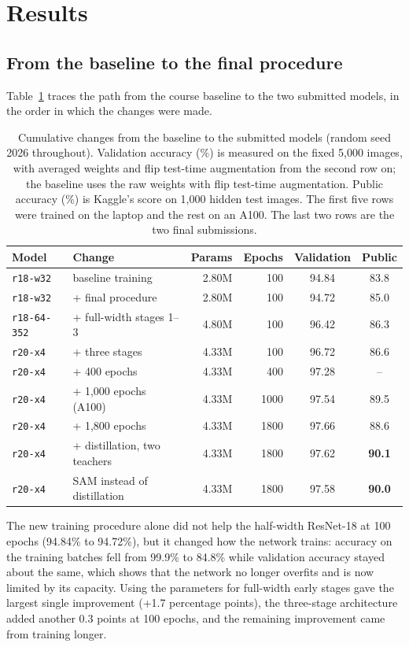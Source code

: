 \documentclass[letterpaper]{article}
\begin{document}
\section{Results}
\subsection{From the baseline to the final procedure}
Table~\ref{tab:progression} traces the path from the course baseline to the two submitted models, in the order in which the
changes were made.

\begin{table}[t]
\centering
\scriptsize
\setlength{\tabcolsep}{2.4pt}
\begin{tabular}{@{}llrrcc@{}}
\toprule
Model & Change & Params & Epochs & Validation & Public \\
\midrule
\texttt{r18-w32} & baseline training & 2.80M & 100 & 94.84 & 83.8 \\
\texttt{r18-w32} & + final procedure & 2.80M & 100 & 94.72 & 85.0 \\
\texttt{r18-64-352} & + full-width stages 1--3 & 4.80M & 100 & 96.42 & 86.3 \\
\texttt{r20-x4} & + three stages & 4.33M & 100 & 96.72 & 86.6 \\
\texttt{r20-x4} & + 400 epochs & 4.33M & 400 & 97.28 & -- \\
\texttt{r20-x4} & + 1,000 epochs (A100) & 4.33M & 1000 & 97.54 & 89.5 \\
\texttt{r20-x4} & + 1,800 epochs & 4.33M & 1800 & 97.66 & 88.6 \\
\texttt{r20-x4} & + distillation, two teachers & 4.33M & 1800 & 97.62 & \textbf{90.1} \\
\texttt{r20-x4} & SAM instead of distillation & 4.33M & 1800 & 97.58 & \textbf{90.0} \\
\bottomrule
\end{tabular}
\caption{Cumulative changes from the baseline to the submitted models (random seed 2026 throughout). Validation accuracy (\%) is
measured on the fixed 5,000 images, with averaged weights and flip test-time augmentation from the second row on; the baseline
uses the raw weights with flip test-time augmentation. Public accuracy (\%) is Kaggle's score on 1,000 hidden test images. The
first five rows were trained on the laptop and the rest on an A100. The last two rows are the two final submissions.}
\label{tab:progression}
\end{table}

The new training procedure alone did not help the half-width ResNet-18 at 100 epochs (94.84\% to 94.72\%), but it changed how
the network trains: accuracy on the training batches fell from 99.9\% to 84.8\% while validation accuracy stayed about the same,
which shows that the network no longer overfits and is now limited by its capacity. Using the parameters for full-width early
stages gave the largest single improvement (+1.7 percentage points), the three-stage architecture added another 0.3 points at
100 epochs, and the remaining improvement came from training longer.
\end{document}
